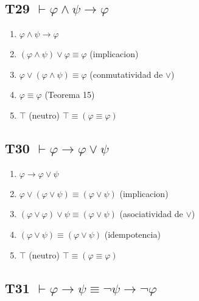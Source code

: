 \documentclass[a4paper,11pt]{article}
\begin{document}
\subsection{T29 $\vdash \varphi \land \psi \rightarrow \varphi$}

\begin{enumerate}
    \item $\varphi \land \psi \rightarrow \varphi$
    \item $(\varphi \land \psi) \lor \varphi \equiv \varphi$ \hfill (implicacion)
    \item $\varphi \lor (\varphi \land \psi) \equiv \varphi$ \hfill (conmutatividad de $\lor$)
    \item $\varphi \equiv \varphi$ \hfill (Teorema 15)
    \item $\top$ \hfill (neutro) $\top \equiv (\varphi \equiv \varphi)$
\end{enumerate}

\subsection{T30 $\vdash \varphi \rightarrow \varphi \lor \psi$}

\begin{enumerate}
    \item $\varphi \rightarrow \varphi \lor \psi$
    \item $\varphi \lor (\varphi \lor \psi) \equiv (\varphi \lor \psi)$ \hfill (implicacion)
    \item $(\varphi \lor \varphi) \lor \psi \equiv (\varphi \lor \psi)$ \hfill (asociatividad de $\lor$)
    \item $(\varphi \lor \psi) \equiv (\varphi \lor \psi)$ \hfill (idempotencia)
    \item $\top$ \hfill (neutro) $\top \equiv (\varphi \equiv \varphi)$
\end{enumerate}

\subsection{T31 $\vdash \varphi \rightarrow \psi \equiv \neg\psi \rightarrow \neg\varphi$}
\end{document}
